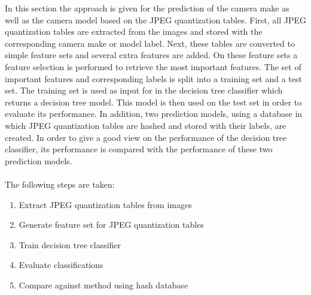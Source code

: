 In this section the approach is given for the prediction of the camera make as well as the camera model based on the JPEG quantization tables.
First, all JPEG quantization tables are extracted from the images and stored with the corresponding camera make or model label. Next, these tables are converted to simple feature sets and several extra features are added. On these feature sets a feature selection is performed to retrieve the most important features. The set of important features and corresponding labels is split into a training set and a test set. The training set is used as input for in the decision tree classifier which returns a decision tree model. This model is then used on the test set in order to evaluate its performance. In addition, two prediction models, using a database in which JPEG quantization tables are hashed and stored with their labels, are created. In order to give a good view on the performance of the decision tree classifier, its performance is compared with the performance of these two prediction models.
\\~\\
The following steps are taken:
\begin{enumerate}
\item Extract JPEG quantization tables from images
\item Generate feature set for JPEG quantization tables
\item Train decision tree classifier 
\item Evaluate classifications
\item Compare against method using hash database
\end{enumerate}


